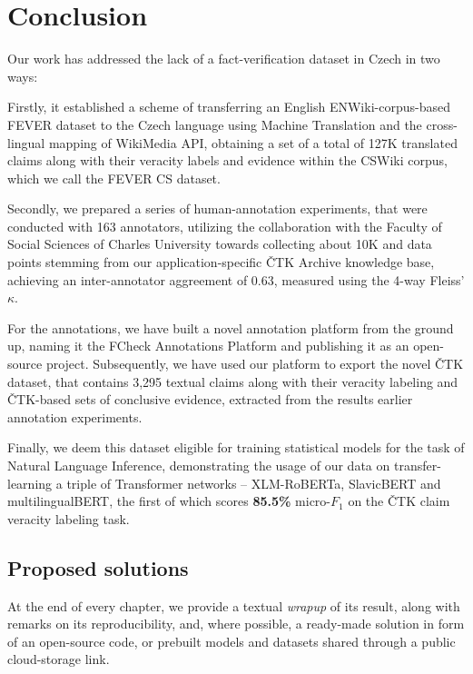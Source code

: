 
\chapter{Conclusion}
\label{chap:conclusion}
\label{chap:proposed}
Our work has addressed the lack of a fact-verification dataset in Czech in two ways:

Firstly, it established a scheme of transferring an English \textsf{ENWiki}-corpus-based \textsf{FEVER} dataset to the Czech language using Machine Translation and the cross-lingual mapping of \textsf{WikiMedia API}, obtaining a set of a total of 127K translated claims along with their veracity labels and evidence within the \textsf{CSWiki} corpus, which we call the \textsf{FEVER CS} dataset.

Secondly, we prepared a series of human-annotation experiments, that were conducted with 163 annotators, utilizing the collaboration with the \textsf{Faculty of Social Sciences of Charles University} towards collecting about 10K  and  data points stemming from our application-specific \textsf{ČTK Archive} knowledge base, achieving an inter-annotator aggreement of 0.63, measured using the 4-way Fleiss' $\kappa$.

For the annotations, we have built a novel annotation platform from the ground up, naming it the \textsf{FCheck Annotations Platform} and publishing it as an open-source project. Subsequently, we have used our platform to export the novel \textsf{ČTK} dataset, that contains 3,295 textual claims along with their veracity labeling and \textsf{ČTK}-based sets of conclusive evidence, extracted from the results earlier annotation experiments.

Finally, we deem this dataset eligible for training statistical models for the task of Natural Language Inference, demonstrating the usage of our data on transfer-learning a triple of Transformer networks -- \textsf{XLM-RoBERTa}, \textsf{SlavicBERT} and \textsf{multilingualBERT}, the first of which scores \textbf{85.5\%} micro-$F_1$ on the \textsf{ČTK} claim veracity labeling task.

\section{Proposed solutions}
At the end of every chapter, we provide a textual \textit{wrapup} of its result, along with remarks on its reproducibility, and, where possible, a ready-made solution in form of an open-source code, or prebuilt models and datasets shared through a public cloud-storage link.

